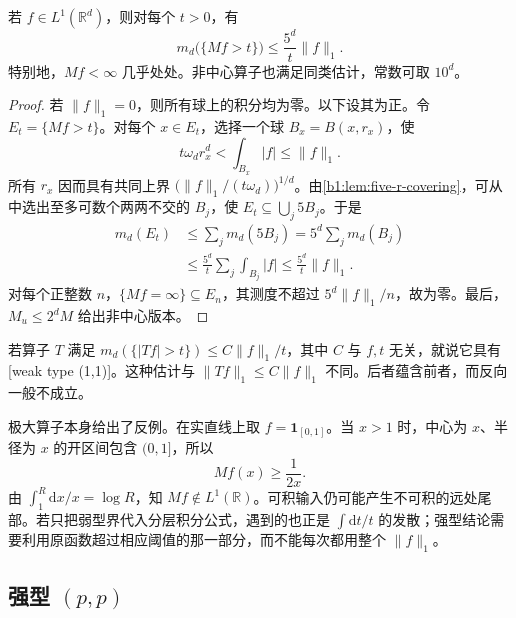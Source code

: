 \begin{theorem}\label{b1:thm:hl-weak-11}
若 \(f\in L^1(\mathbb R^d)\)，则对每个 \(t>0\)，有
\[
 m_d\bigl(\{Mf>t\}\bigr)\leq\frac{5^d}{t}\|f\|_1.
\]
特别地，\(Mf<\infty\) 几乎处处。非中心算子也满足同类估计，常数可取 \(10^d\)。
\end{theorem}
\begin{proof}
若 \(\|f\|_1=0\)，则所有球上的积分均为零。以下设其为正。令 \(E_t=\{Mf>t\}\)。对每个 \(x\in E_t\)，选择一个球 \(B_x=B(x,r_x)\)，使
\[
 t\omega_dr_x^d<\int_{B_x}|f|\leq\|f\|_1.
\]
所有 \(r_x\) 因而具有共同上界 \(\bigl(\|f\|_1/(t\omega_d)\bigr)^{1/d}\)。由\cref{b1:lem:five-r-covering}，可从中选出至多可数个两两不交的 \(B_j\)，使 \(E_t\subseteq\bigcup_j5B_j\)。于是
\[
 \begin{aligned}
 m_d(E_t)&\leq\sum_jm_d(5B_j)
       =5^d\sum_jm_d(B_j)\\
 &\leq\frac{5^d}{t}\sum_j\int_{B_j}|f|
 \leq\frac{5^d}{t}\|f\|_1.
 \end{aligned}
\]
对每个正整数 \(n\)，\(\{Mf=\infty\}\subseteq E_n\)，其测度不超过 \(5^d\|f\|_1/n\)，故为零。最后，\(M_u\leq2^dM\) 给出非中心版本。
\end{proof}

若算子 \(T\) 满足 \(m_d(\{|Tf|>t\})\leq C\|f\|_1/t\)，其中 \(C\) 与 \(f,t\) 无关，就说它具有[weak type (1,1)]。这种估计与 \(\|Tf\|_1\leq C\|f\|_1\) 不同。后者蕴含前者，而反向一般不成立。

\ProseParagraphBreak

极大算子本身给出了反例。在实直线上取 \(f=\mathbf1_{[0,1]}\)。当 \(x>1\) 时，中心为 \(x\)、半径为 \(x\) 的开区间包含 \((0,1]\)，所以
\[
 Mf(x)\geq\frac1{2x}.
\]
由 \(\int_1^R\mathrm dx/x=\log R\)，知 \(Mf\notin L^1(\mathbb R)\)。可积输入仍可能产生不可积的远处尾部。若只把弱型界代入分层积分公式，遇到的也正是 \(\int\mathrm dt/t\) 的发散；强型结论需要利用原函数超过相应阈值的那一部分，而不能每次都用整个 \(\|f\|_1\)。

\subsection{强型 \texorpdfstring{\((p,p)\)}{(p,p)}}
\label{b1:subsec:130303}

